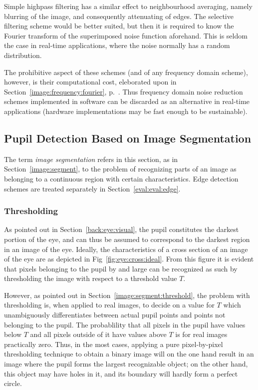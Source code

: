 Simple highpass filtering has a similar effect to neighbourhood
averaging, namely blurring of the image, and consequently attenuating
of edges.  The selective filtering scheme would be better suited, but
then it is required to know the Fourier transform of the superimposed
noise function aforehand.  This is seldom the case in real-time
applications, where the noise normally has a random distribution.

The prohibitive aspect of these schemes (and of any frequency domain
scheme), however, is their computational cost, eleborated upon in
Section~\ref{image:frequency:fourier}, p.~\pageref{pg:fft:O}.  Thus
frequency domain noise reduction schemes implemented in software can
be discarded as an alternative in real-time applications (hardware
implementations may be fast enough to be sustainable).

\subsection{Pupil Detection Based on Image Segmentation}
\label{eval:eval:segment}

The term {\em image segmentation\/} refers in this section, as in
Section~\ref{image:segment}, to the problem of recognizing parts of an
image as belonging to a continuous region with certain
characteristics.  Edge detection schemes are treated separately in
Section~\ref{eval:eval:edge}.

\subsubsection{Thresholding}

As pointed out in Section~\ref{back:eye:visual}, the pupil constitutes
the darkest portion of the eye, and can thus be assumed to correspond
to the darkest region in an image of the eye.  Ideally, the
characteristics of a cross section of an image of the eye are as
depicted in Fig~\ref{fig:eye:cross:ideal}.  From this figure it is
evident that pixels belonging to the pupil by and large can be
recognized as such by thresholding the image with respect to a
threshold value $T$.


However, as pointed out in Section~\ref{image:segment:threshold}, the
problem with thresholding is, when applied to real images, to decide
on a value for $T$ which unambiguously differentiates between actual
pupil points and points not belonging to the pupil.  The probablility
that all pixels in the pupil have values below $T$ and all pixels
outside of it have values above $T$ is for real images practically
zero.  Thus, in the most cases, applying a pure pixel-by-pixel
thresholding technique to obtain a binary image will on the one hand
result in an image where the pupil forms the largest recognizable
object; on the other hand, this object may have holes in it, and its
boundary will hardly form a perfect circle.

